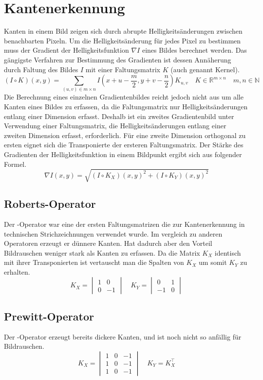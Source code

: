 \section{Kantenerkennung}
\writtenby{\dcauthornameewie}%
Kanten in einem Bild zeigen sich durch abrupte Helligkeitsänderungen zwischen benachbarten Pixeln.
Um die Helligkeitsänderung für jedes Pixel zu bestimmen muss der Gradient der Helligkeitsfunktion $\nabla I$ eines Bildes berechnet werden.
Das gängigste Verfahren zur Bestimmung des Gradienten ist dessen Annäherung durch Faltung des Bildes $I$ mit einer Faltungsmatrix $K$ (auch genannt Kernel).
  \[ (I\circ K)(x,y) =
       \sum_{(u,v)\in m\times n}
       I\left(x+u-\frac{m}{2},y+v-\frac{n}{2}\right)K_{u,v}
       \quad K\in\mathbb{R}^{m\times n}
       \quad m,n \in\mathbb{N} \]
Die Berechnung eines einzelnen Gradientenbildes reicht jedoch nicht aus um alle Kanten eines Bildes zu erfassen, da die Faltungsmatrix nur Helligkeitsänderungen entlang einer Dimension erfasst.
Deshalb ist ein zweites Gradientenbild unter Verwendung einer Faltungsmatrix, die Helligkeitsänderungen entlang einer zweiten Dimension erfasst, erforderlich.
Für eine zweite Dimension orthogonal zu ersten eignet sich die Transponierte der ersteren Faltungsmatrix.
Der Stärke des Gradienten der Helligkeitsfunktion in einem Bildpunkt ergibt sich aus folgender Formel.
  \[ \nabla I(x,y) = \sqrt{(I \circ K_X)(x,y)^2 + (I \circ K_Y)(x,y)^2} \]

\subsection*{Roberts-Operator}
Der -Operator \cite{DBLP:books/garland/Roberts63} war eine der ersten Faltungsmatrizen die zur Kantenerkennung in technischen Strichzeichnungen verwendet wurde.
Im vergleich zu anderen Operatoren erzeugt er dünnere Kanten.
Hat dadurch aber den Vorteil Bildrauschen weniger stark als Kanten zu erfassen.
Da die Matrix $K_X$ identisch mit ihrer Transponierten ist vertauscht man die Spalten von $K_X$ um somit $K_Y$ zu erhalten.
  \[ K_X = \begin{vmatrix}
       1 &  0 \\
       0 & -1
     \end{vmatrix}
     \quad K_Y = \begin{vmatrix}
        0 & 1 \\
       -1 & 0
     \end{vmatrix} \]

\subsection*{Prewitt-Operator}
Der -Operator \cite[S.~108]{prewitt1070} erzeugt bereits dickere Kanten, und ist noch nicht so anfällig für Bildrauschen.
  \[ K_X = \begin{vmatrix}
       1 & 0 & -1 \\
       1 & 0 & -1 \\
       1 & 0 & -1
     \end{vmatrix}
     \quad K_Y = K_X^\top \]


